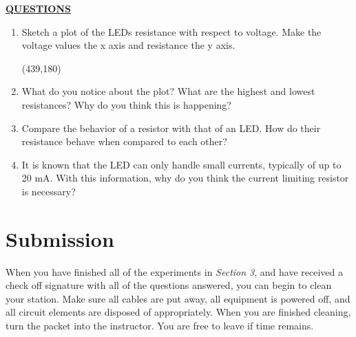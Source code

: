 \documentclass[12pt]{article}
\begin{document}
\textbf{\underline{QUESTIONS}}
\begin{enumerate}
    \item Sketch a plot of the LEDs resistance with respect to voltage. Make the voltage values the x axis and resistance the y axis.
    
        \framebox(439,180){}
        
    \item What do you notice about the plot? What are the highest and lowest resistances? Why do you think this is happening?
        \fillwithlines{1in}
        
    \item Compare the behavior of a resistor with that of an LED. How do their resistance behave when compared to each other?
        \fillwithlines{0.75in}
    \item It is known that the LED can only handle small currents, typically of up to 20 mA. With this information, why do you think the current limiting resistor is necessary?
        \fillwithlines{0.75in}
\end{enumerate}

\checkoffsubsub

\section{Submission}

When you have finished all of the experiments in \textit{Section 3}, and have received a check off signature with all of the questions answered, you can begin to clean your station. Make sure all cables are put away, all equipment is powered off, and all circuit elements are disposed of appropriately. When you are finished cleaning, turn the packet into the instructor. You are free to leave if time remains.
\end{document}
